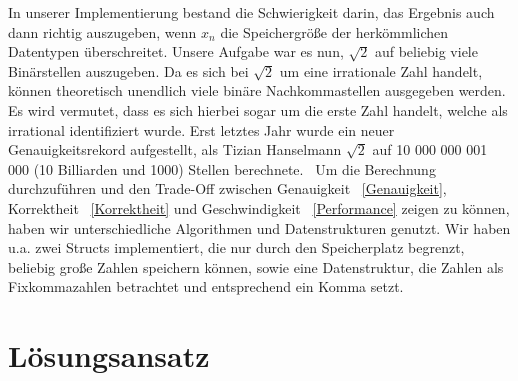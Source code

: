 \documentclass[course=erap]{aspdoc}
\begin{document}
    In unserer Implementierung bestand die Schwierigkeit darin, das Ergebnis auch dann richtig auszugeben, wenn \begin{math}
                                                                                                                    x_n
    \end{math} die Speichergröße der herkömmlichen Datentypen überschreitet. Unsere Aufgabe war es nun, \begin{math}
                                                                                                            \sqrt{2}
    \end{math} auf beliebig viele Binärstellen auszugeben. Da es sich bei \begin{math}
                                                                              \sqrt{2}
    \end{math} um eine irrationale Zahl handelt, können theoretisch unendlich viele binäre Nachkommastellen ausgegeben werden. Es wird vermutet, dass es sich hierbei sogar um die erste Zahl handelt, welche als irrational identifiziert wurde.\cite{first} Erst letztes Jahr wurde ein neuer Genauigkeitsrekord aufgestellt, als Tizian Hanselmann \begin{math}
                                                                                                                                                                                                                                                                                                                                                          \sqrt{2}
    \end{math} auf 10 000 000 001 000 (10 Billiarden und 1000) Stellen berechnete.~\cite{record} Um die Berechnung durchzuführen und den \glqq Trade-Off \grqq zwischen  Genauigkeit ~\ref{Genauigkeit}, Korrektheit ~\ref{Korrektheit} und Geschwindigkeit ~\ref{Performance} zeigen zu können, haben wir unterschiedliche Algorithmen und Datenstrukturen genutzt. Wir haben u.a. zwei Structs implementiert, die nur durch den Speicherplatz begrenzt, beliebig große Zahlen speichern können, sowie eine Datenstruktur, die Zahlen als Fixkommazahlen betrachtet und entsprechend ein Komma setzt.

    \newpage
    \section{Lösungsansatz}
\end{document}
